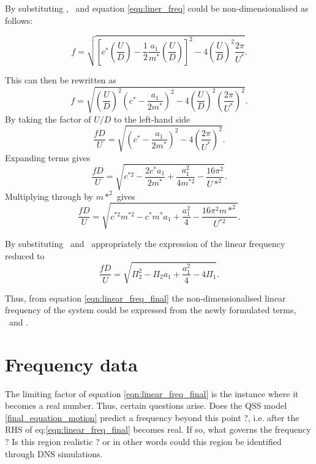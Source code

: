 By substituting \cstar, \mstar\ and \ustar equation \ref{eqn:liner_freq} could be non-dimensionalised as follows:

\begin{equation}
f = \sqrt{\left[c^*\left(\frac{U}{D}\right) - \frac{1}{2}\frac{a_1}{m^*}\left(\frac{U}{D}\right)\right]^2 - 4\left(\frac{U}{D}\right)^2\frac{2\pi}{U^*}}.
\end{equation}

This can then be rewritten as
\begin{equation}
f = \sqrt{\left(\frac{U}{D}\right)^2\left(c^*-\frac{a_1}{2m^*}\right)^2 - 4\left(\frac{U}{D}\right)^2\left(\frac{2\pi}{U^*}\right)^2}.
\end{equation}
By taking the factor of $U/D$ to the left-hand side
\begin{equation}
\frac{fD}{U} = \sqrt{\left(c^*-\frac{a_1}{2m^*}\right)^2 - 4\left(\frac{2\pi}{U^*}\right)^2}.
\end{equation}
Expanding terms gives
\begin{equation}
\frac{fD}{U} = \sqrt{c^{*2} - \frac{2c^*a_1}{2m^*} + \frac{a_1^2}{4m^{*2}} - \frac{16\pi^2}{U*^2}}.
\end{equation}
Multiplying through by $m*^2$ gives
\begin{equation}
\frac{fD}{U} = \sqrt{c^{*2}m^{*2} - c^*m^*a_1 + \frac{a_1^2}{4} - \frac{16\pi^2m{*^2}}{U^{*2}}}.
\end{equation}


By substituting \massstiff\ and \massdamp\ appropriately the expression of the linear frequency reduced to   
\begin{equation}
\label{eqn:linear_freq_final}
\frac{fD}{U} = \sqrt{\Pi_2^2 - \Pi_2a_1 + \frac{a_1^2}{4} - 4\Pi_1}.
\end{equation}

Thus, from equation \ref{eqn:linear_freq_final} the non-dimensionalised linear frequency of the system could be expressed from the newly formulated terms, \massstiff\ and \massdamp.

\section{Frequency data}

The limiting factor of equation \ref{eqn:linear_freq_final} is the instance where it becomes a real number. Thus, certain questions arise. Does the QSS model \ref{final_equation_motion} predict a frequency beyond this point ?, i.e. after the RHS of eq:\ref{eqn:linear_freq_final} becomes real. If so, what governs the frequency ? Is this region realistic ? or in other words could this region be identified through DNS simulations. 

